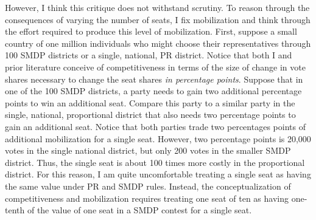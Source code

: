 \documentclass[12pt]{article}
\begin{document}
\begin{appendix}
However, I think this critique does not withstand scrutiny. To reason through the consequences of varying the number of seats, I fix mobilization and think through the effort required to produce this level of mobilization. 
First, suppose a small country of one million individuals who might choose their representatives through 100 SMDP districts or a single, national, PR district. Notice that both I and prior literature conceive of competitiveness in terms of the size of change in vote shares necessary to change the seat shares \textit{in percentage points}. Suppose that in one of the 100 SMDP districts, a party needs to gain two additional percentage points to win an additional seat. Compare this party to a similar party in the single, national, proportional district that also needs two percentage points to gain an additional seat. Notice that both parties trade two percentages points of additional mobilization for a single seat. However, two percentage points is 20,000 votes in the single national district, but only 200 votes in the smaller SMDP district. Thus, the single seat is about 100 times more costly in the proportional district. For this reason, I am quite uncomfortable treating a single seat as having the same value under PR and SMDP rules. Instead, the conceptualization of competitiveness and mobilization requires treating one seat of ten as having one-tenth of the value of one seat in a SMDP contest for a single seat. 


\end{appendix}
\end{document}
